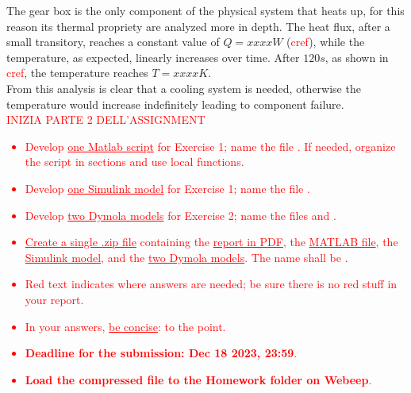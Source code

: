 \documentclass[11pt,a4paper,oneside]{article}
\newcommand{\tr}{\textcolor{red}}
\begin{document}
The gear box is the only component of the physical system that heats up, for this reason its thermal propriety are analyzed more in depth.   
The heat flux, after a small transitory, reaches a constant value of $Q=xxxxW$ (\tr{cref}), while the temperature, as expected, linearly increases over time.
After $120s$, as shown in \tr{cref}, the temperature reaches $T=xxxxK$.
\\

From this analysis is clear that a cooling system is needed, otherwise the temperature would increase indefinitely leading to component failure.
\\

\tr{INIZIA PARTE 2 DELL'ASSIGNMENT}






\clearpage
\tr{
\begin{itemize}
\item Develop \underline{one Matlab script} for Exercise 1; name the file . If needed, organize the script in sections and use local functions. 
\item Develop \underline{one Simulink model} for Exercise 1; name the file . 
\item Develop \underline{two Dymola models} for Exercise 2; name the files  and  . 
\item \underline{Create a single .zip file} containing the \underline{report in PDF}, the \underline{MATLAB file}, the \underline{Simulink model}, and the \underline{two Dymola models}. The name shall be .
\item Red text indicates where answers are needed; be sure there is no red stuff in your report.
\item In your answers, \underline{be concise}: to the point.
\item \textbf{Deadline for the submission: Dec 18 2023, 23:59}.
\item \textbf{Load the compressed file to the Homework folder on Webeep}.
\end{itemize}
}


\clearpage
\end{document}
